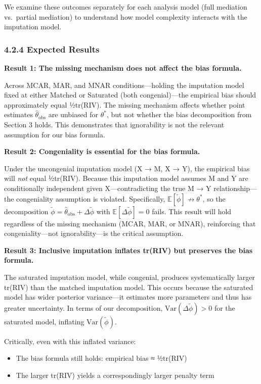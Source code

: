 \documentclass[
]{article}
\providecommand{\tightlist}{%
  \setlength{\itemsep}{0pt}\setlength{\parskip}{0pt}}
\begin{document}
We examine these outcomes separately for each analysis model (full
mediation vs.~partial mediation) to understand how model complexity
interacts with the imputation model.

\subsubsection{4.2.4 Expected Results}\label{expected-results}

\textbf{Result 1: The missing mechanism does not affect the bias
formula.}

Across MCAR, MAR, and MNAR conditions---holding the imputation model
fixed at either Matched or Saturated (both congenial)---the empirical
bias should approximately equal ½tr(RIV). The missing mechanism affects
whether point estimates \(\hat{\theta}_{\text{obs}}\) are unbiased for
\(\theta^*\), but not whether the bias decomposition from Section 3
holds. This demonstrates that ignorability is not the relevant
assumption for our bias formula.

\textbf{Result 2: Congeniality is essential for the bias formula.}

Under the uncongenial imputation model (X → M, X → Y), the empirical
bias will \emph{not} equal ½tr(RIV). Because this imputation model
assumes M and Y are conditionally independent given X---contradicting
the true M → Y relationship---the congeniality assumption is violated.
Specifically, \(\mathbb{E}[\tilde{\phi}] \not\to \theta^*\), so the
decomposition
\(\tilde{\phi} = \hat{\theta}_{\text{obs}} + \Delta\tilde{\phi}\) with
\(\mathbb{E}[\Delta\tilde{\phi}] = 0\) fails. This result will hold
regardless of the missing mechanism (MCAR, MAR, or MNAR), reinforcing
that congeniality---not ignorability---is the critical assumption.

\textbf{Result 3: Inclusive imputation inflates tr(RIV) but preserves
the bias formula.}

The saturated imputation model, while congenial, produces systematically
larger tr(RIV) than the matched imputation model. This occurs because
the saturated model has wider posterior variance---it estimates more
parameters and thus has greater uncertainty. In terms of our
decomposition, \(\text{Var}(\Delta\tilde{\phi}) > 0\) for the saturated
model, inflating \(\text{Var}(\tilde{\phi})\).

Critically, even with this inflated variance:

\begin{itemize}
\tightlist
\item
  The bias formula still holds: empirical bias ≈ ½tr(RIV)
\item
  The larger tr(RIV) yields a correspondingly larger penalty term
\end{itemize}
\end{document}
